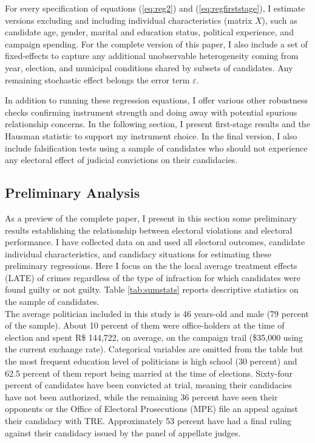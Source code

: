 \documentclass[11pt]{article}
\newcommand{\refp}[1]{(\ref{#1})}
\begin{document}
For every specification of equations \refp{eq:reg2} and \refp{eq:regfirststage}, I estimate versions excluding and including individual characteristics (matrix $X$), such as candidate age, gender, marital and education status, political experience, and campaign spending. For the complete version of this paper, I also include a set of fixed-effects to capture any additional unobservable heterogeneity coming from year, election, and municipal conditions shared by subsets of candidates. Any remaining stochastic effect belongs the error term $\varepsilon$.

In addition to running these regression equations, I offer various other robustness checks confirming instrument strength and doing away with potential spurious relationship concerns. In the following section, I present first-stage results and the Hausman statistic to support my instrument choice. In the final version, I also include falsification tests using a sample of candidates who should not experience any electoral effect of judicial convictions on their candidacies.

\subsection{Preliminary Analysis} \label{subsec:results_paper1}

As a preview of the complete paper, I present in this section some preliminary results establishing the relationship between electoral violations and electoral performance. I have collected data on and used all electoral outcomes, candidate individual characteristics, and candidacy situations for estimating these preliminary regressions. Here I focus on the the local average treatment effects (LATE) of crimes regardless of the type of infraction for which candidates were found guilty or not guilty. Table \ref{tab:sumstats} reports descriptive statistics on the sample of candidates. \\



The average politician included in this study is 46 years-old and male (79 percent of the sample). About 10 percent of them were office-holders at the time of election and spent R\$ 144,722, on average, on the campaign trail (\$35,000 using the current exchange rate). Categorical variables are omitted from the table but the most frequent education level of politicians is high school (30 percent) and 62.5 percent of them report being married at the time of elections. Sixty-four percent of candidates have been convicted at trial, meaning their candidacies have not been authorized, while the remaining 36 percent have seen their opponents or the Office of Electoral Prosecutions (MPE) file an appeal against their candidacy with TRE. Approximately 53 percent have had a final ruling against their candidacy issued by the panel of appellate judges. \\
\end{document}

